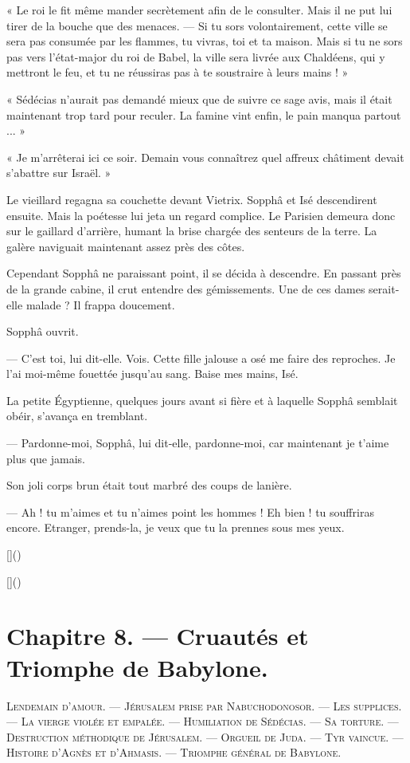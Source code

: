 \documentclass[a4paper, 11pt, oneside, polutonikogreek, french]{article}
\begin{document}
« Le roi le fit même mander secrètement afin de le consulter. Mais il ne put lui tirer de la bouche que des menaces. --- Si tu sors volontairement, cette ville se sera pas consumée par les flammes, tu vivras, toi et ta maison. Mais si tu ne sors pas vers l'état-major du roi de Babel, la ville sera livrée aux Chaldéens, qui y mettront le feu, et tu ne réussiras pas à te soustraire à leurs mains ! »

« Sédécias n'aurait pas demandé mieux que de suivre ce sage avis, mais il était maintenant trop tard pour reculer. La famine vint enfin, le pain manqua partout ... »

« Je m'arrêterai ici ce soir. Demain vous connaîtrez quel affreux châtiment devait s'abattre sur Israël. »

\bigskip
\centerline{\EightStarTaper}
\centerline{\EightStarTaper\EightStarTaper}
\bigskip

Le vieillard regagna sa couchette devant Vietrix. Sopphâ et Isé descendirent ensuite. Mais la poétesse lui jeta un regard complice. Le Parisien demeura donc sur le gaillard d'arrière, humant la brise chargée des senteurs de la terre. La galère naviguait maintenant assez près des côtes.

Cependant Sopphâ ne paraissant point, il se décida à descendre. En passant près de la grande cabine, il crut entendre des gémissements. Une de ces dames serait-elle malade ? Il frappa doucement.

Sopphâ ouvrit.

--- C'est toi, lui dit-elle. Vois. Cette fille jalouse a osé me faire des reproches. Je l'ai moi-même fouettée jusqu'au sang. Baise mes mains, Isé.

La petite Égyptienne, quelques jours avant si fière et à laquelle Sopphâ semblait obéir, s'avança en tremblant.

--- Pardonne-moi, Sopphâ, lui dit-elle, pardonne-moi, car maintenant je t'aime plus que jamais.

Son joli corps brun était tout marbré des coups de lanière.

--- Ah ! tu m'aimes et tu n'aimes point les hommes ! Eh bien ! tu souffriras encore. Etranger, prends-la, je veux que tu la prennes sous mes yeux.

[]()

[]()
\clearpage
\section{Chapitre 8. --- Cruautés et Triomphe de Babylone.}
\begin{center}
\scshape
\small
Lendemain d'amour. --- Jérusalem prise par Nabuchodonosor. --- Les supplices. --- La vierge violée et empalée. --- Humiliation de Sédécias. --- Sa torture. --- Destruction méthodique de Jérusalem. --- Orgueil de Juda. --- Tyr vaincue. --- Histoire d'Agnès et d'Ahmasis. --- Triomphe général de Babylone.
\end{center}
\end{document}
